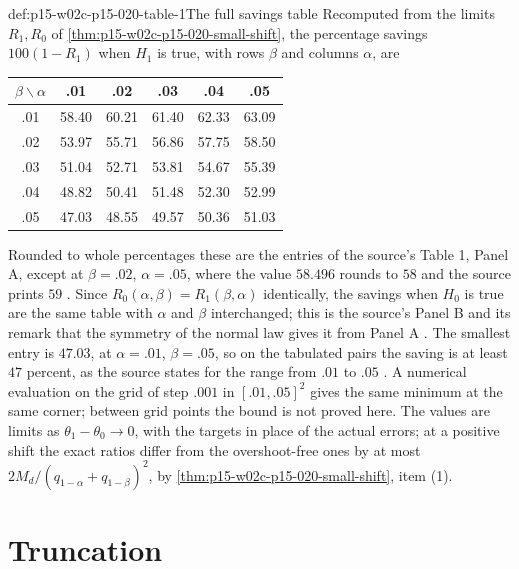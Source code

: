 \begin{hbexample}{def:p15-w02c-p15-020-table-1}{The full savings table}
Recomputed from the limits \(R_1,R_0\) of
\cref{thm:p15-w02c-p15-020-small-shift}, the percentage savings
\(100(1-R_1)\) when \(H_1\) is true, with rows \(\beta\) and columns
\(\alpha\), are
\begin{center}
\begin{tabular}{c|ccccc}
\(\beta\backslash\alpha\)&.01&.02&.03&.04&.05\\\hline
.01&58.40&60.21&61.40&62.33&63.09\\
.02&53.97&55.71&56.86&57.75&58.50\\
.03&51.04&52.71&53.81&54.67&55.39\\
.04&48.82&50.41&51.48&52.30&52.99\\
.05&47.03&48.55&49.57&50.36&51.03
\end{tabular}
\end{center}
Rounded to whole percentages these are the entries of the source's
Table 1, Panel A, except at \(\beta=.02\), \(\alpha=.05\), where the
value \(58.496\) rounds to \(58\) and the source prints \(59\)
\cite[Section 4.3, Table 1, p.~147]{Wald1945SequentialTests}.
Since \(R_0(\alpha,\beta)=R_1(\beta,\alpha)\) identically, the savings
when \(H_0\) is true are the same table with \(\alpha\) and \(\beta\)
interchanged; this is the source's Panel B and its remark that the
symmetry of the normal law gives it from Panel A
\cite[Section 4.3, p.~147]{Wald1945SequentialTests}. The smallest entry
is \(47.03\), at \(\alpha=.01\), \(\beta=.05\), so on the tabulated
pairs the saving is at least \(47\) percent, as the source states for
the range from \(.01\) to \(.05\)
\cite[Section 4.3, p.~148]{Wald1945SequentialTests}. A numerical
evaluation on the grid of step \(.001\) in \([.01,.05]^2\) gives the same
minimum at the same corner; between grid points the bound is not proved
here. The values are limits as \(\theta_1-\theta_0\to0\), with the
targets in place of the actual errors; at a positive shift the exact
ratios differ from the overshoot-free ones by at most
\(2M_d/(q_{1-\alpha}+q_{1-\beta})^2\), by
\cref{thm:p15-w02c-p15-020-small-shift}, item (1).
\end{hbexample}

\section{Truncation}
\label{sec:p15-w02c-p15-020-truncation}


